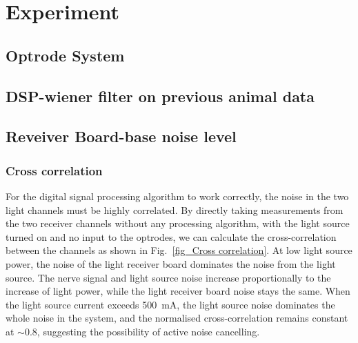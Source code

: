 \chapter[Experiment]{Experiment} \label{c:tc2} 

\section{Optrode System}


\section{DSP-wiener filter on previous animal data}


\section{Reveiver Board-base noise level}

\subsection{Cross correlation}

For the digital signal processing algorithm to work correctly, the noise in the two light channels must be highly correlated.  By directly taking measurements from the two receiver channels without any processing algorithm, with the light source turned on and no input to the optrodes, we can calculate the cross-correlation between the channels as shown in Fig.~\ref{fig_Cross correlation}.  At low light source power, the noise of the light receiver board dominates the noise from the light source.  The nerve signal and light source noise increase proportionally to the increase of light power, while the light receiver board noise stays the same.  When the light source current exceeds \qty{500}{\mA}, the light source noise dominates the whole noise in the system, and the normalised cross-correlation remains constant at $\sim$0.8, suggesting the possibility of active noise cancelling.

